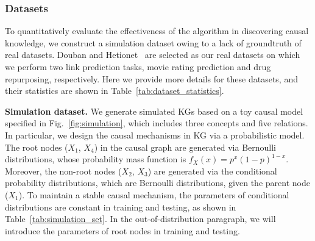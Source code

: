 \subsubsection{\textbf{Datasets}}
To quantitatively evaluate the effectiveness of the algorithm in discovering causal knowledge, we construct a simulation dataset owing to a lack of groundtruth of real datasets.
Douban and Hetionet~\cite{himmelstein2017systematic} are selected as our real datasets on which we perform two link prediction tasks, movie rating prediction and drug repurposing, respectively.
Here we provide more details for these datasets, and their statistics are shown in Table~\ref{tab:dataset_statistics}.


\begin{table}[t]
\centering
\caption{Dataset statistics of all the experiments.}
\label{tab:dataset_statistics}
\end{table}

\noindent
{\bf Simulation dataset.}
We generate simulated KGs based on a toy causal model specified in Fig.~\ref{fig:simulation}, which includes three concepts and five relations.
In particular, we design the causal mechanisms in KG via a probabilistic model.
The root nodes ($X_1$, $X_4$) in the causal graph are generated via Bernoulli distributions, whose probability mass function is $f_X(x)=p^x(1-p)^{1-x}$.
Moreover, the non-root nodes ($X_2$, $X_3$) are generated via the conditional probability distributions, which are Bernoulli distributions, given the parent node ($X_1$).
To maintain a stable causal mechanism, the parameters of conditional distributions are constant in training and testing, as shown in Table~\ref{tab:simulation_set}.
In the out-of-distribution paragraph, we will introduce the parameters of root nodes in training and testing.


